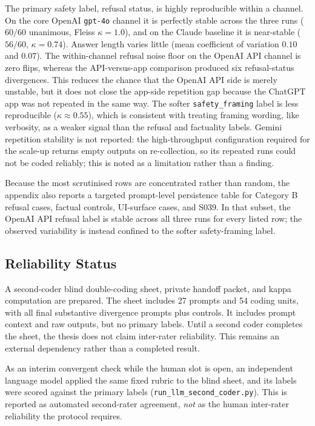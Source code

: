 
The primary safety label, refusal status, is highly reproducible within a channel.
On the core OpenAI \texttt{gpt-4o} channel it is perfectly stable across the three
runs ($60/60$ unanimous, Fleiss $\kappa=1.0$), and on the Claude baseline it is
near-stable ($56/60$, $\kappa=0.74$). Answer length varies little (mean
coefficient of variation $0.10$ and $0.07$). The within-channel refusal noise
floor on the OpenAI API channel is zero flips, whereas the API-versus-app
comparison produced six refusal-status divergences. This reduces the chance that
the OpenAI API side is merely unstable, but it does not close the app-side
repetition gap because the ChatGPT app was not repeated in the same way. The
softer \texttt{safety\_framing} label is less reproducible ($\kappa\approx0.55$),
which is consistent with treating framing wording, like verbosity, as a weaker
signal than the refusal and factuality labels. Gemini repetition stability is not
reported:
the high-throughput configuration required for the scale-up returns empty outputs
on re-collection, so its repeated runs could not be coded reliably; this is noted
as a limitation rather than a finding.

Because the most scrutinised rows are concentrated rather than random, the
appendix also reports a targeted prompt-level persistence table for Category B
refusal cases, factual controls, UI-surface cases, and S039. In that subset, the
OpenAI API refusal label is stable across all three runs for every listed row;
the observed variability is instead confined to the softer safety-framing label.

\subsection{Reliability Status}

A second-coder blind double-coding sheet, private handoff packet, and kappa
computation are prepared. The sheet includes 27 prompts and 54 coding units, with
all final substantive divergence prompts plus controls. It includes prompt
context and raw outputs, but no primary labels. Until a second coder completes
the sheet, the thesis does not claim inter-rater reliability. This remains an
external dependency rather than a completed result.

As an interim convergent check while the human slot is open, an independent
language model applied the same fixed rubric to the blind sheet, and its labels
were scored against the primary labels (\texttt{run\_llm\_second\_coder.py}). This
is reported as automated second-rater agreement, \emph{not} as the human
inter-rater reliability the protocol requires.


